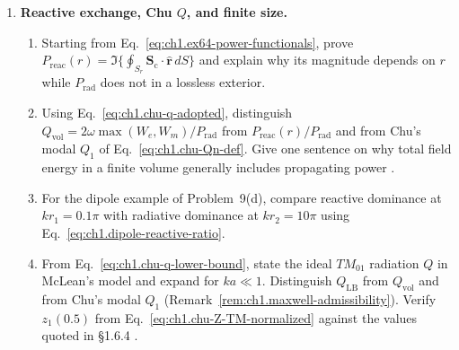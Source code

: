 \begin{enumerate}
\item \textbf{Reactive exchange, Chu $Q$, and finite size.}
\begin{enumerate}[label=(\alph*)]
\item Starting from Eq.~\eqref{eq:ch1.ex64-power-functionals}, prove $P_{\mathrm{reac}}(r)=\Im\{\oint_{S_r}\mathbf{S}_\mathrm{c}\cdot\hat{\mathbf{r}}\,dS\}$ and explain why its magnitude depends on $r$ while $P_{\mathrm{rad}}$ does not in a lossless exterior.
\item Using Eq.~\eqref{eq:ch1.chu-q-adopted}, distinguish $Q_{\mathrm{vol}}=2\omega\max(W_e,W_m)/P_{\mathrm{rad}}$ from $P_{\mathrm{reac}}(r)/P_{\mathrm{rad}}$ and from Chu's modal $Q_1$ of Eq.~\eqref{eq:ch1.chu-Qn-def}. Give one sentence on why total field energy in a finite volume generally includes propagating power \cite{chu1948,mcclean1996}.
\item For the dipole example of Problem~9(d), compare reactive dominance at $kr_1=0.1\pi$ with radiative dominance at $kr_2=10\pi$ using Eq.~\eqref{eq:ch1.dipole-reactive-ratio}.
\item From Eq.~\eqref{eq:ch1.chu-q-lower-bound}, state the ideal $TM_{01}$ radiation $Q$ in McLean's model and expand for $ka\ll1$. Distinguish $Q_{\mathrm{LB}}$ from $Q_{\mathrm{vol}}$ and from Chu's modal $Q_1$ (Remark~\ref{rem:ch1.maxwell-admissibility}). Verify $z_1(0.5)$ from Eq.~\eqref{eq:ch1.chu-Z-TM-normalized} against the values quoted in §1.6.4 \cite{mcclean1996,chu1948,chu1948tr064}.
\end{enumerate}
\end{enumerate}
